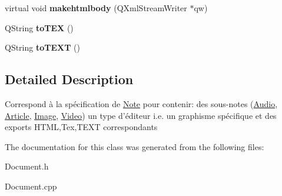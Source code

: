 \begin{DoxyCompactItemize}
\item 
\hypertarget{classDocument_aeca93d0a046ccf87ff54daa56ea4fbcc}{virtual void {\bfseries makehtmlbody} (\-Q\-Xml\-Stream\-Writer $\ast$qw)}\label{classDocument_aeca93d0a046ccf87ff54daa56ea4fbcc}

\item 
\hypertarget{classDocument_abfe8c70f4db8563d41b1fed8ddbe268c}{\-Q\-String {\bfseries to\-T\-E\-X} ()}\label{classDocument_abfe8c70f4db8563d41b1fed8ddbe268c}

\item 
\hypertarget{classDocument_a47012344c13c7b6f43cce93d23e5f636}{\-Q\-String {\bfseries to\-T\-E\-X\-T} ()}\label{classDocument_a47012344c13c7b6f43cce93d23e5f636}

\end{DoxyCompactItemize}


\subsection{\-Detailed \-Description}
\-Correspond à la spécification de \hyperlink{classNote}{\-Note} pour contenir\-: des sous-\/notes (\hyperlink{classAudio}{\-Audio}, \hyperlink{classArticle}{\-Article}, \hyperlink{classImage}{\-Image}, \hyperlink{classVideo}{\-Video}) un type d'éditeur i.\-e. un graphisme spécifique et des exports \-H\-T\-M\-L,\-Tex,\-T\-E\-X\-T correspondants 

\-The documentation for this class was generated from the following files\-:\begin{DoxyCompactItemize}
\item 
\-Document.\-h\item 
\-Document.\-cpp\end{DoxyCompactItemize}

